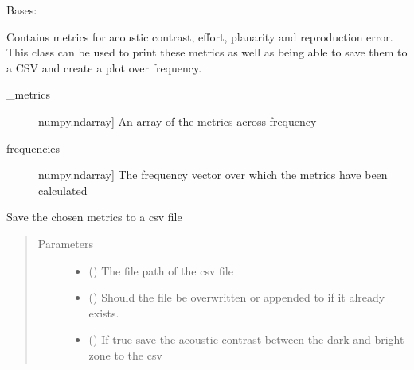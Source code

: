 \documentclass[letterpaper,10pt,english]{sphinxmanual}
\begin{document}
\begin{fulllineitems}
\label{\detokenize{source/pyzones:pyzones.Metrics}}
Bases: 

Contains metrics for acoustic contrast, effort, planarity and reproduction error. This class can be used to print
these metrics as well as being able to save them to a CSV and create a plot over frequency.
\begin{description}
\item[{\_metrics}] \leavevmode{[}numpy.ndarray{]}
An array of the metrics across frequency

\item[{frequencies}] \leavevmode{[}numpy.ndarray{]}
The frequency vector over which the metrics have been calculated

\end{description}

\begin{fulllineitems}
\label{\detokenize{source/pyzones:pyzones.Metrics.output_csv}}
Save the chosen metrics to a csv file
\begin{quote}\begin{description}
\item[{Parameters}] \leavevmode\begin{itemize}
\item {} 
 () \textendash{} The file path of the csv file

\item {} 
 () \textendash{} Should the file be overwritten or appended to if it already exists.

\item {} 
 () \textendash{} If true save the acoustic contrast between the dark and bright zone to the csv


\end{itemize}
\end{description}
\end{quote}
\end{fulllineitems}
\end{fulllineitems}
\end{document}
